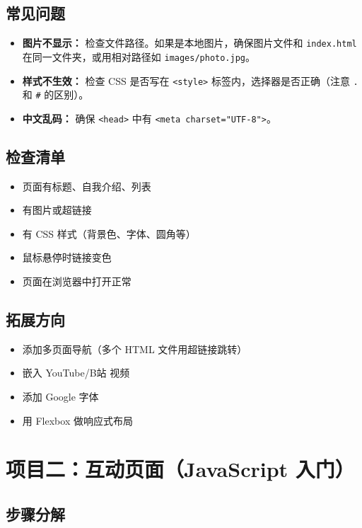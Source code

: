 \documentclass[a4paper,12pt]{ctexart}
\begin{document}
\subsection*{常见问题}

\begin{itemize}
  \item \textbf{图片不显示：} 检查文件路径。如果是本地图片，确保图片文件和 \texttt{index.html} 在同一文件夹，或用相对路径如 \texttt{images/photo.jpg}。
  \item \textbf{样式不生效：} 检查 CSS 是否写在 \texttt{<style>} 标签内，选择器是否正确（注意 \texttt{.} 和 \texttt{\#} 的区别）。
  \item \textbf{中文乱码：} 确保 \texttt{<head>} 中有 \texttt{<meta charset="UTF-8">}。
\end{itemize}

\subsection*{检查清单}

\begin{itemize}
  \item 页面有标题、自我介绍、列表
  \item 有图片或超链接
  \item 有 CSS 样式（背景色、字体、圆角等）
  \item 鼠标悬停时链接变色
  \item 页面在浏览器中打开正常
\end{itemize}

\subsection*{拓展方向}

\begin{itemize}
  \item 添加多页面导航（多个 HTML 文件用超链接跳转）
  \item 嵌入 YouTube/B站 视频
  \item 添加 Google 字体
  \item 用 Flexbox 做响应式布局
\end{itemize}

\section*{项目二：互动页面（JavaScript 入门）}

\subsection*{步骤分解}
\end{document}
